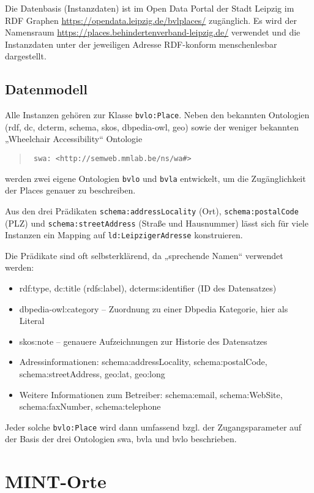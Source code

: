 \documentclass[a4paper,11pt]{article}
\begin{document}
Die Datenbasis (Instanzdaten) ist im Open Data Portal der Stadt Leipzig im RDF
Graphen \url{https://opendata.leipzig.de/bvlplaces/} zugänglich.  Es wird der
Namensraum \url{https://places.behindertenverband-leipzig.de/} verwendet und
die Instanzdaten unter der jeweiligen Adresse RDF-konform menschenlesbar
dargestellt. 

\subsection{Datenmodell}

Alle Instanzen gehören zur Klasse \texttt{bvlo:Place}.  Neben den bekannten
Ontologien (rdf, dc, dcterm, schema, skos, dbpedia-owl, geo) sowie der weniger
bekannten „Wheelchair Accessibility“ Ontologie
\begin{quote}\tt
  swa: <http://semweb.mmlab.be/ns/wa\#>
\end{quote}
werden zwei eigene Ontologien \texttt{bvlo} und \texttt{bvla} entwickelt, um
die Zugänglichkeit der Places genauer zu beschreiben.

Aus den drei Prädikaten \texttt{schema:addressLocality} (Ort),
\texttt{schema:postalCode} (PLZ) und \texttt{schema:streetAddress} (Straße und
Hausnummer) lässt sich für viele Instanzen ein Mapping auf
\texttt{ld:LeipzigerAdresse} konstruieren.

Die Prädikate sind oft selbsterklärend, da „sprechende Namen“ verwendet werden:
\begin{itemize}\itemsep0pt
\item rdf:type, dc:title (rdfs:label), dcterms:identifier (ID des Datensatzes)
\item dbpedia-owl:category -- Zuordnung zu einer Dbpedia Kategorie, hier als
  Literal 
\item skos:note -- genauere Aufzeichnungen zur Historie des Datensatzes
\item Adressinformationen: schema:addressLocality,
  schema:postalCode,\\ schema:streetAddress, geo:lat, geo:long
\item Weitere Informationen zum Betreiber: schema:email, schema:WebSite,\\
  schema:faxNumber, schema:telephone
\end{itemize}
Jeder solche \texttt{bvlo:Place} wird dann umfassend bzgl. der Zugangsparameter
auf der Basis der drei Ontologien swa, bvla und bvlo beschrieben.
\newpage

\section{MINT-Orte}
\end{document}
